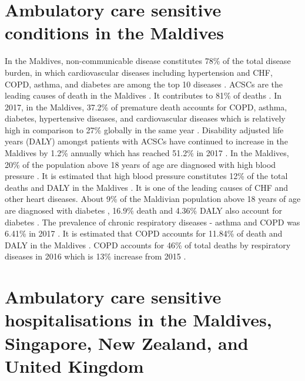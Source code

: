 \section{Ambulatory care sensitive conditions in the Maldives}

In the Maldives, non-communicable disease constitutes 78\% of the total disease burden, in which cardiovascular diseases including hypertension and CHF, COPD, asthma, and diabetes are among the top 10 diseases \cite{Maldives:healthprofile:2016}. ACSCs are the leading causes of death in the Maldives \cite{WHO:country:strategy}. It contributes to 81\% of deaths \cite{WHO:country:strategy}. In  2017, in the Maldives, 37.2\% of premature death accounts for COPD, asthma, diabetes, hypertensive diseases, and cardiovascular diseases which is relatively high in comparison to 27\% globally in the same year \cite{GHD:health:2017}. Disability adjusted life years (DALY) amongst patients with ACSCs have continued to increase in the Maldives by 1.2\% annually which has reached 51.2\% in 2017 \cite{GHD:health:2017}. In the Maldives, 20\% of the population above 18 years of age are diagnosed with high blood pressure \cite{WHO:profile:country}. It is estimated that high blood pressure constitutes 12\% of the total deaths and DALY in the Maldives \cite{GHD:health:2017}. It is one of the leading causes of CHF and other heart diseases. About 9\% of the Maldivian population above 18 years of age are diagnosed with diabetes \cite{WHO:profile:country}, 16.9\% death and 4.36\% DALY also account for diabetes \cite{GHD:health:2017}. The prevalence of chronic respiratory diseases - asthma and COPD was 6.41\% in 2017 \cite{GHD:health:2017}. It is estimated that COPD accounts for 11.84\% of death and DALY in the Maldives  \cite{GHD:health:2017}. COPD accounts for 46\% of total deaths by respiratory diseases in 2016 which is 13\% increase from 2015 \cite{Maldives:nationalhealthstatistics:2019}.

\section{Ambulatory care sensitive hospitalisations in the Maldives, Singapore, New Zealand, and United Kingdom}

